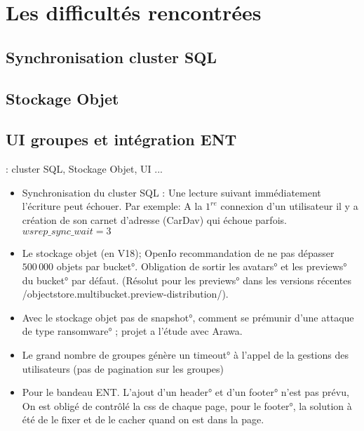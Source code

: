 
\section{Les difficultés rencontrées}
\subsection{Synchronisation cluster SQL}
\subsection{Stockage Objet}
\subsection{UI groupes et intégration ENT}
\begin{frame}[fragile]{\smallsec : cluster SQL, Stockage Objet,  UI ... }

\begin{itemize}
	\item Synchronisation du cluster SQL : Une lecture suivant immédiatement l'écriture peut échouer.  
	Par exemple: A la $1^{re}$ connexion d'un utilisateur il y a création de son carnet d'adresse (CarDav) qui échoue parfois.
		$wsrep\_sync\_wait = 3$
\end{itemize}
\begin{itemize}

\item Le stockage objet (en \small{V18});  OpenIo recommandation de ne pas dépasser $500\,000$ objets par \ang{bucket}. Obligation de sortir les \ang{avatars} et les \ang{previews} du \ang{bucket} par défaut. (Résolut pour les \ang{previews} dans les versions récentes \code/objectstore.multibucket.preview-distribution/).

\item Avec le stockage objet pas de \ang{snapshot}, comment se prémunir d'une attaque de type \ang{ransomware} ; projet a l'étude avec Arawa. 

\end{itemize}


\begin{itemize}
 \item Le grand nombre de groupes génère un \ang{timeout} à l'appel de la gestions des utilisateurs (pas de pagination sur les groupes)
 \item Pour le bandeau ENT. L'ajout d'un \ang{header} et d'un \ang{footer} n'est pas prévu, On est obligé de contrôlé la css de chaque page, pour le \ang{footer}, la solution à été de le fixer et de le cacher quand on est dans la page. 
\end{itemize}

\end{frame}
